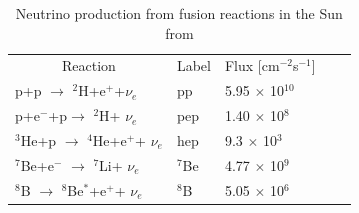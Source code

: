 \begin{table}[!h]
\centering
\begin{tabular}{lllll}  
\toprule
\multicolumn{1}{c}{Reaction} & \multicolumn{1}{c}{Label} & \multicolumn{1}{c}{Flux [cm$^{-2}$s$^{-1}$]}
\\
\cmidrule(r){1-1}
\cmidrule(r){2-2}
\cmidrule(r){3-3}
p+p $\rightarrow$ $^2$H+e$^+$+$\nu_e$           & pp                & 5.95 $\times$ 10$^{10}$\\
p+e$^-$+p$\rightarrow$ $^2$H+ $\nu_e$           & pep               & 1.40 $\times$ 10$^{8}$\\
$^3$He+p $\rightarrow$ $^4$He+e$^+$+ $\nu_e$    & hep               & 9.3  $\times$ 10$^{3}$\\
$^7$Be+e$^-$ $\rightarrow$ $^7$Li+ $\nu_e$      & $^7$Be            & 4.77 $\times$ 10$^{9}$\\
$^8$B $\rightarrow$ $^8$Be$^*$+e$^+$+ $\nu_e$   & $^8$B             & 5.05 $\times$ 10$^{6}$\\
\bottomrule   
\end{tabular}
\caption{Neutrino production from fusion reactions in the Sun from \cite{Bellerive:2003rj} }
\label{solar_nuetrino_table}
\end{table}


